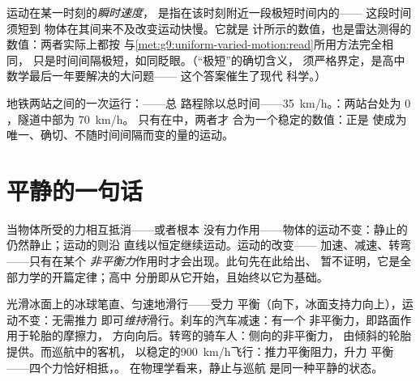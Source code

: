 \begin{definition}[瞬时速度]\label{def:g9:uniform-varied-motion:instant}
运动在某一时刻的\emph{瞬时速度}，
是指在该时刻附近一段极短时间内的——
这段时间须短到
物体在其间来不及改变运动快慢。它就是
计所示的数值，也是雷达测得的数值：两者实际上都按
与\cref{met:g9:uniform-varied-motion:read}所用方法完全相同，
只是时间间隔极短，如同眨眼。（“极短”的确切含义，
须严格界定，是高中数学最后一年要解决的大问题——
这个答案催生了现代
科学。）
\end{definition}

\begin{example}[平均速度与瞬时速度对照]\label{ex:g9:uniform-varied-motion:sidebyside}
地铁两站之间的一次运行：——总
路程除以总时间——\qty{35}{km/h}。：两站台处为 $0$，隧道中部为 \qty{70}{km/h}。
只有在中，两者才
合为一个稳定的数值：正是
使成为唯一、确切、不随时间间隔而变的量的运动。
\end{example}

\section{平静的一句话}

\begin{proposition}[平衡的力不改变运动]\label{prop:g9:uniform-varied-motion:inertia}
当物体所受的力相互抵消——或者根本
没有力作用——物体的运动不变：静止的
仍然静止；运动的则沿
直线以恒定继续运动。运动的改变——
加速、减速、转弯——只有在某个
\emph{非平衡力}作用时才会出现。此句先在此给出、
暂不证明，它是全部力学的开篇定律；高中
分册即从它开始，且始终以它为基础。
\end{proposition}

\begin{example}[用这句话读懂世界]\label{ex:g9:uniform-varied-motion:reading}
光滑冰面上的冰球笔直、匀速地滑行——受力
平衡（向下，冰面支持力向上），运动不变：无需推力
即可\emph{维持}滑行。刹车的汽车减速：有一个
非平衡力，即路面作用于轮胎的摩擦力，
方向向后。转弯的骑车人：侧向的非平衡力，
由倾斜的轮胎提供。而巡航中的客机，
以稳定的\qty{900}{km/h}飞行：推力平衡阻力，升力
平衡——四个力恰好相抵，。
在物理学看来，静止与巡航
是同一种平静的状态。
\end{example}


